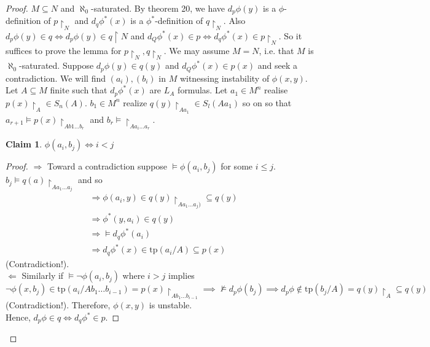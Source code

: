 \documentclass[letterpaper, 12pt]{article}
\newcommand{\tp}{\mbox{tp}}
\theoremstyle{stdthm}
\theoremstyle{stddef}
\theoremstyle{stdnonum}
\newtheorem{claim}{Claim}
\theoremstyle{stdqands}
\theoremstyle{stdbold}
\begin{document}
\begin{proof}
$M\subseteq N$ and $\aleph_0$-saturated. By theorem 20, we have $d_p \phi(y)$ is a $\phi$-definition of $p\upharpoonright_N$ and $d_q \phi^*(x)$ is a $\phi^*$-definition of $q\upharpoonright_N$. Also $d_p \phi(y) \in q \iff d_p \phi(y) \in q \upharpoonright N$ and $d_Q \phi^*(x) \in p \iff d_q \phi^*(x) \in p\upharpoonright_N$. So it suffices to prove the lemma for $p\upharpoonright_N, q\upharpoonright_N$. We may assume $M = N$, i.e. that $M$ is $\aleph_0$-saturated. Suppose $d_p \phi(y) \in q(y)$ and $d_Q \phi^*(x) \in p(x)$ and seek a contradiction. We will find $(a_i),(b_i)$ in $M$ witnessing instability of $\phi(x,y)$. Let $A \subseteq M$ finite such that $d_p \phi^*(x)$ are $L_A$ formulas. Let $a_1 \in M^n$ realise $p(x) \upharpoonright_A \in S_n(A)$.   $b_1 \in M^n$ realize $q(y) \upharpoonright_{Aa_1} \in S_l(Aa_1)$ so on so that $a_{r+1} \models p(x) \upharpoonright_{Ab1\dots b_r}$ and $b_r \models \upharpoonright_{Aa_i \dots a_r}$. 

\begin{claim} 
$\phi(a_i,b_j) \iff i<j$ 
\end{claim}

\begin{proof}
$\Rightarrow$ Toward a contradiction suppose $\models \phi(a_i,b_j)$ for some $i\leq j$. $b_j \models q(a) \upharpoonright_{Aa_1\dots a_j}$ and so 
\begin{align*}
&\Rightarrow \phi(a_i,y) \in q(y)\upharpoonright_{Aa_1 \dots a_j)} \subseteq q(y) \\
&\Rightarrow \phi^*(y,a_i) \in q(y) \\
&\Rightarrow \models d_q \phi^*(a_i) \\
&\Rightarrow d_q \phi^*(x) \in \tp(a_i/A) \subseteq p(x)
\end{align*}
(Contradiction!). \\

$\Leftarrow$ Similarly if $\models \neg \phi(a_i,b_j)$ where $i>j$ implies $\neg \phi(x,b_j) \in \tp(a_i/Ab_1\dots b_{i-1}) = p(x) \upharpoonright_{Ab_1\dots b_{i-1}} \implies \nvDash d_p \phi(b_j) \implies d_p \phi \notin \tp(b_j /A) = q(y) \upharpoonright_A \subseteq q(y)$ (Contradiction!). Therefore, $\phi(x,y)$ is unstable. \\

Hence, $d_p \phi \in q \iff d_q \phi^* \in p$.  
\end{proof}
\end{proof}


\end{document}
